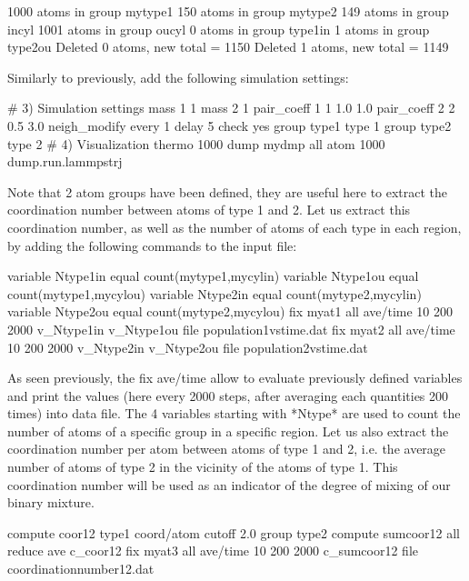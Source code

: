 \begin{lcverbatim}
1000 atoms in group mytype1
150 atoms in group mytype2
149 atoms in group incyl
1001 atoms in group oucyl
0 atoms in group type1in
1 atoms in group type2ou
Deleted 0 atoms, new total = 1150
Deleted 1 atoms, new total = 1149
\end{lcverbatim}

Similarly to previously, add the following simulation
settings:

\begin{lcverbatim}
# 3) Simulation settings
mass 1 1
mass 2 1
pair_coeff 1 1 1.0 1.0
pair_coeff 2 2 0.5 3.0
neigh_modify every 1 delay 5 check yes
group type1 type 1
group type2 type 2
# 4) Visualization
thermo 1000
dump mydmp all atom 1000 dump.run.lammpstrj
\end{lcverbatim}

Note that 2 atom groups have been defined, they are useful
here to extract the coordination number between atoms of
type 1 and 2. Let us extract this coordination number, as
well as the number of atoms of each type in each region, by
adding the following commands to the input file:

\begin{lcverbatim}
variable Ntype1in equal count(mytype1,mycylin)
variable Ntype1ou equal count(mytype1,mycylou)
variable Ntype2in equal count(mytype2,mycylin)
variable Ntype2ou equal count(mytype2,mycylou)
fix myat1 all ave/time 10 200 2000 v_Ntype1in v_Ntype1ou file population1vstime.dat
fix myat2 all ave/time 10 200 2000 v_Ntype2in v_Ntype2ou file population2vstime.dat
\end{lcverbatim}

As seen previously, the fix ave/time
allow to evaluate previously defined variables and print
the values (here every 2000 steps, after averaging each quantities 200 times)
into data file. The 4 variables starting with *Ntype* are used to count
the number of atoms of a specific group in a specific
region. 
Let us also extract the coordination number per atom between atoms 
of type 1 and 2, i.e. the average number of atoms of type 2 in the vicinity 
of the atoms of type 1. This coordination number will be used as an indicator of the 
degree of mixing of our binary mixture. 

\begin{lcverbatim}
compute coor12 type1 coord/atom cutoff 2.0 group type2
compute sumcoor12 all reduce ave c_coor12
fix myat3 all ave/time 10 200 2000 c_sumcoor12 file coordinationnumber12.dat
\end{lcverbatim}

